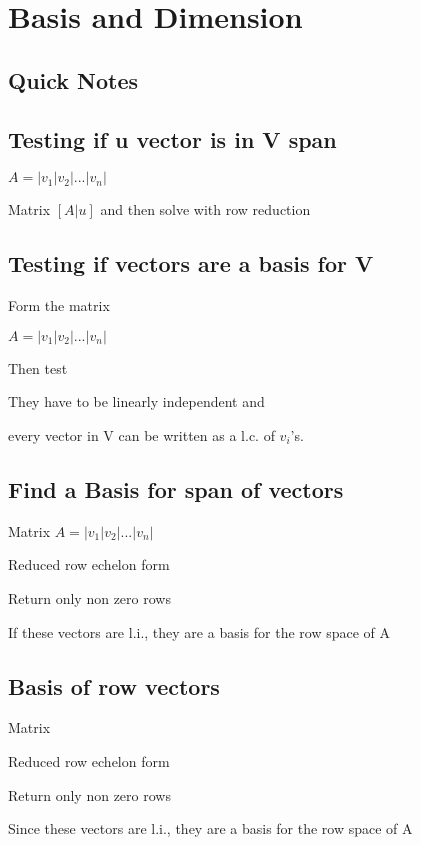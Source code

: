 \documentclass{extarticle}
\begin{document}
\section{Basis and Dimension}
\subsection{Quick Notes}
\subsection{Testing if u vector is in V span}

$A = \left|v_1|v_2|...|v_n\right|$

Matrix $[A|u]$ and then solve with row reduction


\subsection{Testing if vectors are a basis for V}

Form the matrix

$A = \left|v_1|v_2|...|v_n\right|$

Then test

They have to be linearly independent and 

every vector in V can be written as a l.c. of $v_i$'s.





\subsection{Find a Basis for span of vectors}

Matrix $A = \left|v_1|v_2|...|v_n\right|$

Reduced row echelon form

Return only non zero rows

If these vectors are l.i., they are a basis for the row space of A





\subsection{Basis of row vectors}

Matrix

Reduced row echelon form

Return only non zero rows

Since these vectors are l.i., they are a basis for the row space of A
\end{document}
